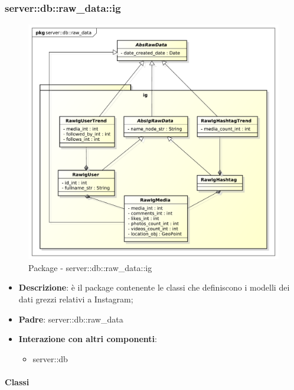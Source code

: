 		\subsubsection{server::db::raw\_data::ig} %
		\label{ssub:bdsm_app_server_db_raw_data_ig}
		\begin{figure}[htbp]
			\centering
			\centerline{\includegraphics[scale=0.5]{./images/server/raw_data_ig.pdf}}
			\caption{Package - server::db::raw\_data::ig}
		\end{figure}

		\begin{itemize}
		  \item \textbf{Descrizione}: è il package contenente le classi che definiscono i modelli dei dati grezzi relativi a Instagram;
		  \item \textbf{Padre}: server::db::raw\_data
		  \item \textbf{Interazione con altri componenti}:
		  	\begin{itemize}
		  		\item server::db
				\end{itemize}
		\end{itemize}

		\paragraph{Classi} %


